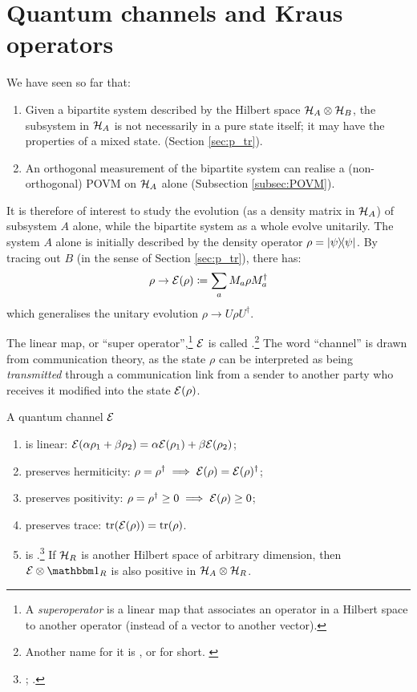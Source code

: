 \section{Quantum channels and Kraus operators}

We have seen so far that:
\begin{enumerate}
\item
  Given a bipartite system
  described by the Hilbert space
  $\mathcal{H}_A\otimes\mathcal{H}_B$,
  the subsystem in $\mathcal{H}_A$
  is not necessarily in a pure state itself; it
  may have the properties of a mixed state.
  (Section \ref{sec:p_tr}).
\item
  An orthogonal measurement of the bipartite system can realise a
  (non-orthogonal) POVM on $\mathcal{H}_A$ alone (Subsection \ref{subsec:POVM}).
\end{enumerate}

It is therefore of interest to study
the evolution (as a density matrix in $\mathcal{H}_A$) of subsystem $A$ alone,
while the bipartite system as a whole evolve unitarily.
The system $A$ alone
is initially described by the density operator $\rho=\ketbra{\psi}$.
By tracing out
$B$
(in the sense of Section \ref{sec:p_tr}),
there has:
\begin{equation}\label{eq:channel}
  \rho \rightarrow \mathcal{E}(\rho) \coloneqq \sum_a M_a \rho M_a^{\dagger}
\end{equation}
which generalises the unitary evolution $\rho \rightarrow U \rho U^{\dagger}$.

The linear map, or ``super operator'',\footnote{
  A \emph{superoperator} is a linear map that associates an operator
  in a Hilbert space to another operator (instead of a vector to another vector).
}
$\mathcal{E}$
is called .\footnote{
  Another name for it is
  ,
  or  for short. \parencite[]{PreskillNotes}
}
The word ``channel'' is drawn from communication theory,
as the state $\rho$ can be interpreted as being \emph{transmitted}
through
a communication link from a sender to another party
who receives it modified into the state $\mathcal{E}(\rho)$.

A quantum channel $\mathcal{E}$
\begin{enumerate}
  \item is linear:
    $\mathcal{E}(\alpha\rho_1+\beta\rho_2) = \alpha\mathcal{E}(\rho_1) + \beta\mathcal{E}(\rho_2)$;
  \item preserves hermiticity:
    $\rho = \rho^{\dagger} \implies \mathcal{E}(\rho) = \mathcal{E}(\rho)^{\dagger}$;
  \item preserves positivity:
    $\rho = \rho^{\dagger} \geq 0 \implies \mathcal{E}(\rho) \geq 0$;
  \item preserves trace:
    $\tr(\mathcal{E}(\rho)) = \tr(\rho)$.
  \item is .\footnote{\citereset
      \cite[.6]{PreskillNotes}; \cite[.4]{NielsenChuang}.
    } If $\mathcal{H}_R$
    is another Hilbert space of arbitrary dimension,
    then $\superop{E} \ox \idop_{R}$ is also positive
    in $\mathcal{H}_A \otimes \mathcal{H}_R$.
\end{enumerate}

